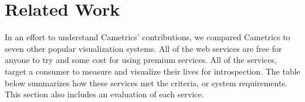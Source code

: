 \documentclass[10pt,a4paper,english]{article}
\begin{document}
\pagebreak{}




\hypertarget{related-work}{}
\section*{Related Work}
\label{related-work}

In an effort to understand Cametrics' contributions, we compared Cametrics to seven other popular visualization systems. All of the web services are free for anyone to try and some cost for using premium services. All of the services, target a consumer to measure and visualize their lives for introspection. The table below summarizes how these services met the criteria, or system requirements. This section also includes an evaluation of each service.
\end{document}
